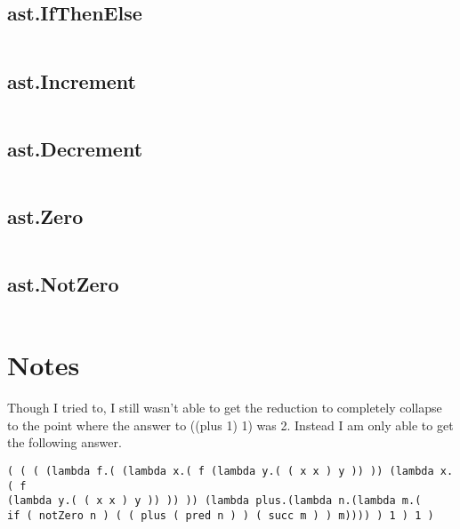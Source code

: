 \documentclass[11pt, numbers=endperiod, parskip=half]{scrartcl}
\begin{document}
\subsection{ast.IfThenElse}
\inputminted[tabsize=2]{java}{LCLParser/src/ast/IfThenElse.java}

\subsection{ast.Increment}
\inputminted[tabsize=2]{java}{LCLParser/src/ast/Increment.java}

\subsection{ast.Decrement}
\inputminted[tabsize=2]{java}{LCLParser/src/ast/Decrement.java}

\subsection{ast.Zero}
\inputminted[tabsize=2]{java}{LCLParser/src/ast/Zero.java}

\subsection{ast.NotZero}
\inputminted[tabsize=2]{java}{LCLParser/src/ast/NotZero.java}

\restoregeometry
\section{Notes}
Though I tried to, I still wasn't able to get the reduction to completely
collapse to the point where the answer to ((plus 1) 1) was 2. Instead
I am only able to get the following answer.
\begin{verbatim}
( ( ( (lambda f.( (lambda x.( f (lambda y.( ( x x ) y )) )) (lambda x.( f
(lambda y.( ( x x ) y )) )) )) (lambda plus.(lambda n.(lambda m.(
if ( notZero n ) ( ( plus ( pred n ) ) ( succ m ) ) m)))) ) 1 ) 1 )
\end{verbatim}
\end{document}
